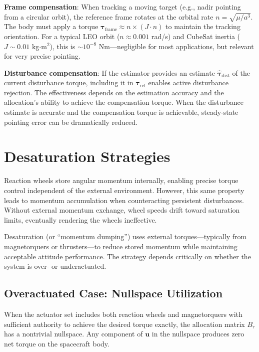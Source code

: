 \documentclass[conference]{IEEEtran}
\begin{document}
\textbf{Frame compensation}: When tracking a moving target (e.g., nadir pointing from a circular orbit), the reference frame rotates at the orbital rate $n = \sqrt{\mu/a^3}$. The body must apply a torque $\boldsymbol{\tau}_{\text{frame}} \approx n \times (J \cdot n)$ to maintain the tracking orientation. For a typical LEO orbit ($n \approx 0.001$ rad/s) and CubeSat inertia ($J \sim 0.01$ kg$\cdot$m$^2$), this is $\sim 10^{-8}$ Nm---negligible for most applications, but relevant for very precise pointing.

\textbf{Disturbance compensation}: If the estimator provides an estimate $\hat{\boldsymbol{\tau}}_{\text{dist}}$ of the current disturbance torque, including it in $\boldsymbol{\tau}_{\text{ref}}$ enables active disturbance rejection. The effectiveness depends on the estimation accuracy and the allocation's ability to achieve the compensation torque. When the disturbance estimate is accurate and the compensation torque is achievable, steady-state pointing error can be dramatically reduced.

\section{Desaturation Strategies}\label{sec:desat}

Reaction wheels store angular momentum internally, enabling precise torque control independent of the external environment. However, this same property leads to momentum accumulation when counteracting persistent disturbances. Without external momentum exchange, wheel speeds drift toward saturation limits, eventually rendering the wheels ineffective.

Desaturation (or ``momentum dumping'') uses external torques---typically from magnetorquers or thrusters---to reduce stored momentum while maintaining acceptable attitude performance. The strategy depends critically on whether the system is over- or underactuated.

\subsection{Overactuated Case: Nullspace Utilization}
When the actuator set includes both reaction wheels and magnetorquers with sufficient authority to achieve the desired torque exactly, the allocation matrix $B_\tau$ has a nontrivial nullspace. Any component of $\mathbf{u}$ in the nullspace produces zero net torque on the spacecraft body.
\end{document}
